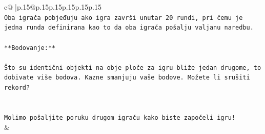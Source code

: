 \documentclass{article}
\begin{document}
{\begin{supertabular}{c@{$\;$}|p{.15\linewidth}@{}p{.15\linewidth}p{.15\linewidth}p{.15\linewidth}p{.15\linewidth}p{.15\linewidth}}
{{{\\ 
\texttt{Oba igrača pobjeđuju ako igra završi unutar 20 rundi, pri čemu je jedna runda definirana kao to da oba igrača pošalju valjanu naredbu.} \\
\\ 
\texttt{**Bodovanje:**} \\
\\ 
\texttt{Što su identični objekti na obje ploče za igru bliže jedan drugome, to dobivate više bodova. Kazne smanjuju vaše bodove. Možete li srušiti rekord?} \\
\\ 
\\ 
\texttt{Molimo pošaljite poruku drugom igraču kako biste započeli igru!} \\
            }
        }
    }
    & \\ \\


\end{supertabular}}
\end{document}
